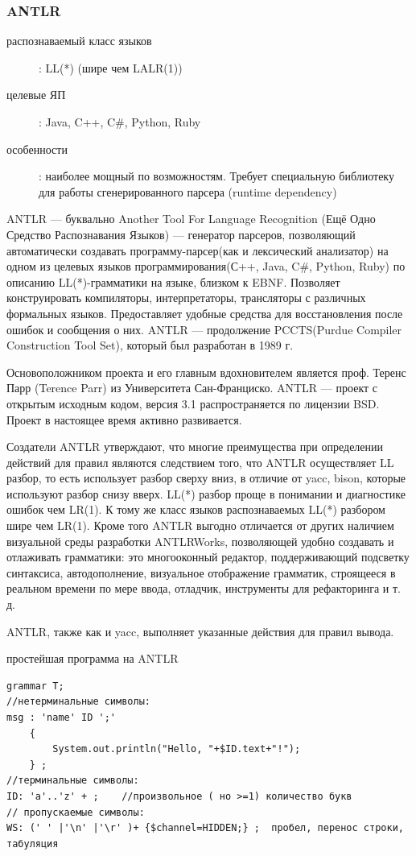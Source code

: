 \documentclass[a4paper,12pt,titlepage]{extarticle}
\begin{document}
\subsubsection*{ANTLR}
\begin{description}
  \item[распознаваемый класс языков]: LL(*) (шире чем LALR(1))
  \item[целевые ЯП]: Java, C++, C\#, Python, Ruby
  \item[особенности]: наиболее мощный по возможностям. Требует специальную
  библиотеку для работы сгенерированного парсера (runtime dependency)
\end{description}
ANTLR — буквально Another Tool For Language Recognition (Ещё Одно Средство
Распознавания Языков) — генератор парсеров, позволяющий автоматически создавать
программу-парсер(как и лексический анализатор) на одном из целевых языков
программирования(С++, Java, C\#, Python, Ruby) по описанию LL(*)-грамматики на
языке, близком к EBNF. Позволяет конструировать компиляторы, интерпретаторы,
трансляторы с различных формальных языков. Предоставляет удобные средства для
восстановления после ошибок и сообщения о них. ANTLR — продолжение PCCTS(Purdue
Compiler Construction Tool Set), который был разработан в 1989 г.

Основоположником проекта и его главным вдохновителем является проф. Теренс Парр
(Terence Parr) из Университета Сан-Франциско. ANTLR — проект с открытым
исходным кодом, версия 3.1 распространяется по лицензии BSD. Проект в
настоящее время активно развивается.

Создатели ANTLR утверждают, что многие преимущества при определении действий
для правил являются следствием того, что ANTLR осуществляет LL разбор, то есть
использует разбор сверху вниз, в отличие от yacc, bison, которые
используют разбор снизу вверх. LL(*) разбор проще в понимании и
диагностике ошибок чем LR(1). К тому же класс языков распознаваемых LL(*)
разбором шире чем LR(1). Кроме того ANTLR выгодно отличается от других наличием
визуальной среды разработки ANTLRWorks, позволяющей удобно создавать и
отлаживать грамматики: это многооконный редактор, поддерживающий подсветку
синтаксиса, автодополнение, визуальное отображение грамматик, строящееся в
реальном времени по мере ввода, отладчик, инструменты для рефакторинга и т. д.

ANTLR, также как и yacc, выполняет указанные действия для правил вывода.

простейшая программа на ANTLR
\begin{verbatim}
grammar T;
//нетерминальные символы:
msg : 'name' ID ';' 
	{
		System.out.println("Hello, "+$ID.text+"!");
	} ;
//терминальные символы:
ID: 'a'..'z' + ;	//произвольное ( но >=1) количество букв
// пропускаемые символы:
WS: (' ' |'\n' |'\r' )+ {$channel=HIDDEN;} ;  пробел, перенос строки, табуляция
\end{verbatim}
\end{document}
